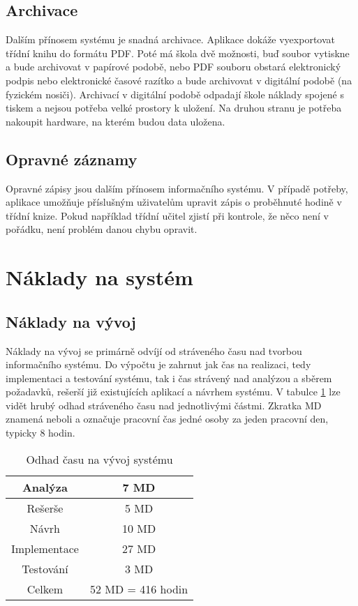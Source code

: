 \subsection{Archivace}
Dalším přínosem systému je snadná archivace. Aplikace dokáže vyexportovat třídní knihu do formátu PDF. Poté má škola dvě možnosti, buď soubor vytiskne a bude archivovat v papírové podobě, nebo PDF souboru obstará elektronický podpis nebo elektronické časové razítko a bude archivovat v digitální podobě (na fyzickém nosiči). Archivací v digitální podobě odpadají škole náklady spojené s tiskem a nejsou potřeba velké prostory k uložení. Na druhou stranu je potřeba nakoupit hardware, na kterém budou data uložena.

\subsection{Opravné záznamy}
Opravné zápisy jsou dalším přínosem informačního systému. V případě potřeby, aplikace umožňuje příslušným uživatelům upravit zápis o proběhnuté hodině v třídní knize. Pokud například třídní učitel zjistí při kontrole, že něco není v pořádku, není problém danou chybu opravit.

\section{Náklady na systém}

\subsection{Náklady na vývoj}
Náklady na vývoj se primárně odvíjí od stráveného času nad tvorbou informačního systému. Do výpočtu je zahrnut jak čas na realizaci, tedy implementaci a testování systému, tak i čas strávený nad analýzou a sběrem požadavků, rešerší již existujících aplikací a návrhem systému. V tabulce \ref{tab:development} lze vidět hrubý odhad stráveného času nad jednotlivými částmi.
Zkratka MD znamená  neboli  a označuje pracovní čas jedné osoby za jeden pracovní den, typicky 8 hodin. \cite{manday}
\clearpage

\begin{table}[h]
    \centering
    \begin{tabular}{|c|c|}
        \hline
         Analýza & 7 MD \\
         \hline
         Rešerše & 5 MD \\
         \hline
         Návrh & 10 MD \\
         \hline
         Implementace & 27 MD \\
         \hline
         Testování & 3 MD \\
         \hline
         \hline
         Celkem & 52 MD = 416 hodin \\
         \hline
    \end{tabular}
    \caption{Odhad času na vývoj systému}
    \label{tab:development}
\end{table}

